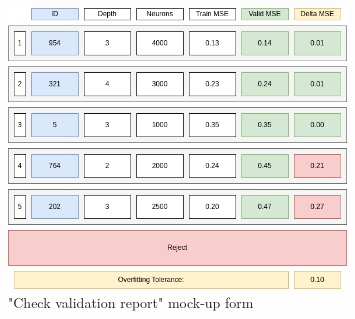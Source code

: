 \begin{figure}[H]
\centering
\includegraphics[width=0.8\textwidth]{figures/check_validation_report.png}
\caption{"Check validation report" mock-up form}
\end{figure}

